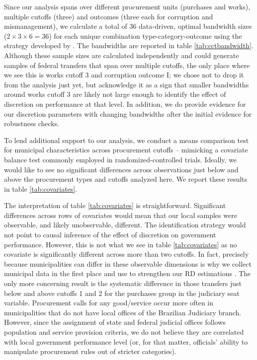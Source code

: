 \documentclass[11pt]{article}
\begin{document}
Since our analysis spans over different procurement units (purchases and works), multiple cutoffs (three) and outcomes (three each for corruption and mismanagement), we calculate a total of 36 data-driven, optimal bandwidth sizes ($2 \times 3 \times 6 = 36$) for each unique combination type-category-outcome using the strategy developed by \citet{CalonicoOptimalDataDrivenRegression2015}. The bandwidths are reported in table \ref{tab:cctbandwidth}. Although these sample sizes are calculated independently and could generate samples of federal transfers that span over multiple cutoffs, the only place where we see this is works cutoff 3 and corruption outcome I; we chose not to drop it from the analysis just yet, but acknowledge it as a sign that smaller bandwidths around works cutoff 3 are likely not large enough to identify the effect of discretion on performance at that level. In addition, we do provide evidence for our discretion parameters with changing bandwidths after the initial \citet{CalonicoOptimalDataDrivenRegression2015} evidence for robustness checks.
\clearpage


To lend additional support to our analysis, we conduct a means comparison test for municipal characteristics across procurement cutoffs -- mimicking a covariate balance test commonly employed in randomized-controlled trials. Ideally, we would like to see no significant differences across observations just below and above the procurement types and cutoffs analyzed here. We report these results in table \ref{tab:covariates}.

\clearpage

The interpretation of table \ref{tab:covariates} is straightforward. Significant differences across rows of covariates would mean that our local samples were observable, and likely unobservable, different. The identification strategy would not point to causal inference of the effect of discretion on government performance. However, this is not what we see in table \ref{tab:covariates} as no covariate is significantly different across more than two cutoffs. In fact, precisely because municipalities can differ in these observable dimensions is why we collect municipal data in the first place and use to strengthen our RD estimations \citep{CalonicoRegressionDiscontinuityDesigns2018}. The only more concerning result is the systematic difference in those transfers just below and above cutoffs 1 and 2 for the purchases group in the judiciary seat variable. Procurement calls for any good/service occur more often in municipalities that do not have local offices of the Brazilian Judiciary branch. However, since the assignment of state and federal judicial offices follows population and service provision criteria, we do not believe they are correlated with local government performance level (or, for that matter, officials' ability to manipulate procurement rules out of stricter categories).
\end{document}
